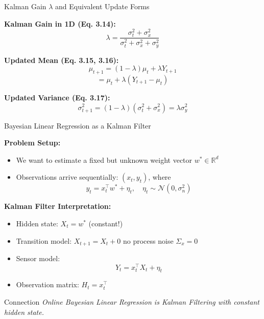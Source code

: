 \documentclass[handout,aspectratio=169]{beamer}
\begin{document}
\begin{frame}{Kalman Gain \( \lambda \) and Equivalent Update Forms}

\textbf{Kalman Gain in 1D (Eq. 3.14):}
\[
\lambda = \frac{\sigma_t^2 + \sigma_x^2}{\sigma_t^2 + \sigma_x^2 + \sigma_y^2}
\]

\vspace{1em}
\textbf{Updated Mean (Eq. 3.15, 3.16):}
\[
\mu_{t+1} = (1 - \lambda) \mu_t + \lambda Y_{t+1} \tag{3.15}
\]
\[
= \mu_t + \lambda (Y_{t+1} - \mu_t) \tag{3.16}
\]

\vspace{0.8em}
\textbf{Updated Variance (Eq. 3.17):}
\[
\sigma_{t+1}^2 = (1 - \lambda)(\sigma_t^2 + \sigma_x^2) = \lambda \sigma_y^2
\]


\end{frame}

\begin{frame}{Bayesian Linear Regression as a Kalman Filter}

\textbf{Problem Setup:}
\begin{itemize}
  \item We want to estimate a fixed but unknown weight vector \( w^* \in \mathbb{R}^d \)
  \item Observations arrive sequentially: \( (x_t, y_t) \), where
  \[
    y_t = x_t^\top w^* + \eta_t, \quad \eta_t \sim \mathcal{N}(0, \sigma_n^2)
  \]
\end{itemize}

\vspace{0.8em}
\textbf{Kalman Filter Interpretation:}
\begin{itemize}
  \item Hidden state: \( X_t = w^* \) (constant!)
  \item Transition model: \( X_{t+1} = X_t + 0 \) \rightarrow no process noise \rightarrow \( \Sigma_x = 0 \)
  \item Sensor model:
  \[
    Y_t = x_t^\top X_t + \eta_t
  \]
  \item Observation matrix: \( H_t = x_t^\top \)
\end{itemize}

\begin{block}{Connection}
\textit{Online Bayesian Linear Regression is Kalman Filtering with constant hidden state.}
\end{block}

\end{frame}
\end{document}
